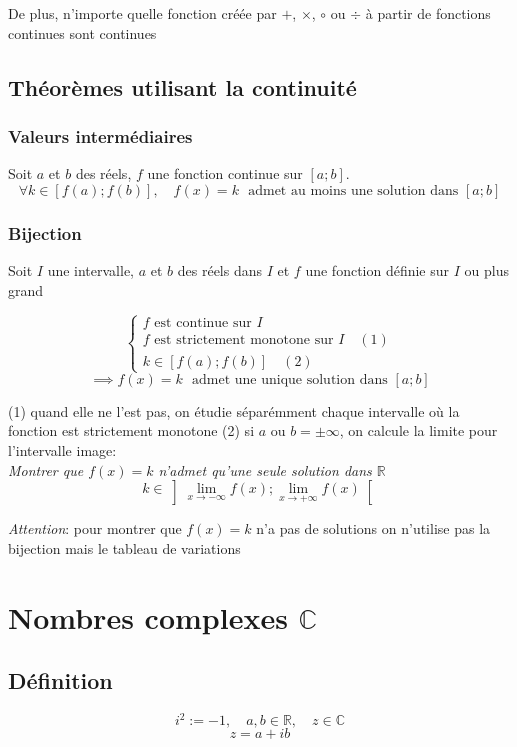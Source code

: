 \documentclass{article}
\newcommand{\R}{\mathds{R}}
\newcommand{\oo}{\infty}
\newcommand{\liminfty}{\lim_{x\to+\oo}}
\newcommand{\limminfty}{\lim_{x\to-\oo}}
\begin{document}
De plus, n'importe quelle fonction créée par $+$, $\times$, $\circ$ ou $\div$ à partir de fonctions continues sont continues

\subsection{Théorèmes utilisant la continuité}
\subsubsection{Valeurs intermédiaires}

Soit $a$ et $b$ des réels, $f$ une fonction continue sur $[a; b]$.
\[\forall k \in [f(a); f(b)],\quad f(x) = k\:\:\:\text{admet au moins une solution dans $[a;b]$}\]

\subsubsection{Bijection}

Soit $I$ une intervalle, $a$ et $b$ des réels dans $I$ et $f$ une fonction définie sur $I$ ou plus grand

$$
\begin{cases}
\text{$f$ est continue sur $I$}\\
\text{$f$ est strictement monotone sur $I$}\quad(1)\\
k \in [f(a); f(b)]\quad(2)
\end{cases}$$
$$
\implies f(x) = k\:\:\:\text{admet une unique solution dans $[a; b]$}
$$

\noindent(1) quand elle ne l'est pas, on étudie séparémment chaque intervalle où la fonction est strictement monotone
\vspace{2pt}
\noindent(2) si $a$ ou $b = \pm\oo$, on calcule la limite pour l'intervalle image:\\
\textit{Montrer que $f(x) = k$ n'admet qu'une seule solution dans $\R$}
\[k \in \left]\limminfty f(x); \liminfty f(x)\right[\]

\vspace{20pt}

\noindent\textit{Attention}: pour montrer que $f(x) = k$ n'a pas de solutions on n'utilise pas la bijection mais le tableau de variations

\newpage\section{Nombres complexes $\mathds{C}$}
\subsection{Définition}
\[i^2 := -1,\quad a, b \in \R,\quad z\in\mathds{C}\]
\[z = a + ib\]
\end{document}
